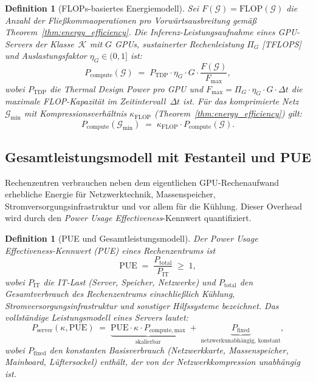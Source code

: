 ﻿\documentclass[12pt, a4paper, openany]{report}
\newtheorem{definition}[theorem]{Definition}
\newcommand{\calG}{\mathcal{G}}
\begin{document}
\begin{definition}[FLOPs-basiertes Energiemodell]
\label{def:flop_energy}
Sei $F(\calG) = \mathrm{FLOP}(\calG)$ die Anzahl der Fließkommaoperationen
pro Vorwärtsausbreitung gemäß Theorem~\ref{thm:energy_efficiency}.  Die
\emph{Inferenz-Leistungsaufnahme} eines GPU-Servers der Klasse~$\mathcal{K}$
mit $G$ GPUs, sustainerter Rechenleistung $\Pi_G$ [TFLOPS] und
Auslastungsfaktor $\eta_G \in (0,1]$ ist:
\begin{equation}
  \label{eq:compute_power}
  P_{\mathrm{compute}}(\calG)
  \;=\;
  P_{\mathrm{TDP}} \cdot \eta_G \cdot G \cdot
  \frac{F(\calG)}{F_{\mathrm{max}}},
\end{equation}
wobei $P_{\mathrm{TDP}}$ die Thermal Design Power pro GPU und
$F_{\mathrm{max}} = \Pi_G \cdot \eta_G \cdot G \cdot \Delta t$ die maximale
FLOP-Kapazität im Zeitintervall~$\Delta t$ ist.  Für das komprimierte
Netz $\calG_{\min}$ mit Kompressionsverhältnis $\kappa_{\mathrm{FLOP}}$
(Theorem~\ref{thm:energy_efficiency}) gilt:
\begin{equation}
  \label{eq:compute_power_compressed}
  P_{\mathrm{compute}}(\calG_{\min})
  \;=\;
  \kappa_{\mathrm{FLOP}} \cdot P_{\mathrm{compute}}(\calG).
\end{equation}
\end{definition}

\subsection{Gesamtleistungsmodell mit Festanteil und PUE}

Rechenzentren verbrauchen neben dem eigentlichen GPU-Rechenaufwand erhebliche
Energie für Netzwerktechnik, Massenspeicher, Stromversorgungsinfrastruktur
und vor allem für die Kühlung.  Dieser Overhead wird durch den
\emph{Power Usage Effectiveness}-Kennwert quantifiziert.

\begin{definition}[PUE und Gesamtleistungsmodell]
\label{def:pue}
Der \emph{Power Usage Effectiveness}-Kennwert (PUE) eines Rechenzentrums ist
\begin{equation}
  \label{eq:pue_def}
  \mathrm{PUE}
  \;=\;
  \frac{P_{\mathrm{total}}}{P_{\mathrm{IT}}}
  \;\geq\; 1,
\end{equation}
wobei $P_{\mathrm{IT}}$ die IT-Last (Server, Speicher, Netzwerke) und
$P_{\mathrm{total}}$ den Gesamtverbrauch des Rechenzentrums
einschließlich Kühlung, Stromversorgungsinfrastruktur und sonstiger
Hilfssysteme bezeichnet.  Das \emph{vollständige Leistungsmodell} eines
Servers lautet:
\begin{equation}
  \label{eq:total_power}
  P_{\mathrm{server}}(\kappa, \mathrm{PUE})
  \;=\;
  \underbrace{\mathrm{PUE} \cdot \kappa \cdot P_{\mathrm{compute,max}}}_{\text{skalierbar}}
  \;+\;
  \underbrace{P_{\mathrm{fixed}}}_{\text{netzwerkunabhängig, konstant}},
\end{equation}
wobei $P_{\mathrm{fixed}}$ den konstanten Basisverbrauch (Netzwerkkarte,
Massenspeicher, Mainboard, Lüftersockel) enthält, der von der Netzwerkkompression
\emph{unabhängig} ist.
\end{definition}
\end{document}
